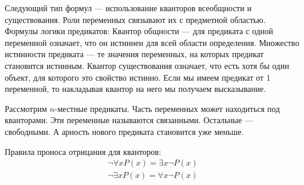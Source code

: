 Следующий тип формул --- использование кванторов всеобщности и существования. Роли переменных связывают их с предметной областью. Формулы логики предикатов: Квантор общности --- для предиката с одной переменной означает, что он истиннен для всей области определения. Множество истинности предиката --- те значения переменных, на которых предикат становится истинным. Квантор существования означает, что есть хотя бы один объект, для которого это свойство истинно. Если мы имеем предикат от 1 переменной, то накладывая квантор на него мы получаем высказывание.

Рассмотрим $n$-местные предикаты. Часть переменных может находиться под кванторами. Эти переменные называются связанными. Остальные --- свободными. А арность нового предиката становится уже меньше.

Правила проноса отрицания для кванторов:
\begin{eqnarray*}
    \neg \forall x P(x) = \exists x \neg P(x) \\
    \neg \exists x P(x) = \forall x \neg P(x)
\end{eqnarray*}
